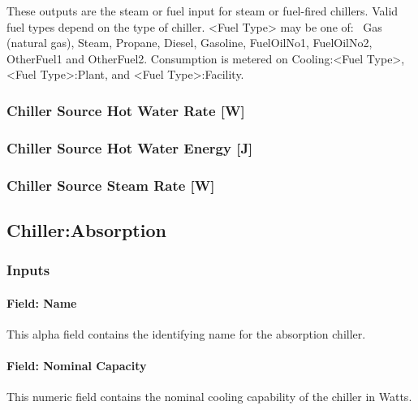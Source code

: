 These outputs are the steam or fuel input for steam or fuel-fired chillers. Valid fuel types depend on the type of chiller. \textless{}Fuel Type\textgreater{} may be one of:~ Gas (natural gas), Steam, Propane, Diesel, Gasoline, FuelOilNo1, FuelOilNo2, OtherFuel1 and OtherFuel2. Consumption is metered on Cooling:\textless{}Fuel Type\textgreater{}, \textless{}Fuel Type\textgreater{}:Plant, and \textless{}Fuel Type\textgreater{}:Facility.

\subsubsection{Chiller Source Hot Water Rate {[}W{]}}\label{chiller-source-hot-water-rate-w}

\subsubsection{Chiller Source Hot Water Energy {[}J{]}}\label{chiller-source-hot-water-energy-j}

\subsubsection{Chiller Source Steam Rate {[}W{]}}\label{chiller-source-steam-rate-w}

\subsection{Chiller:Absorption}\label{chillerabsorption}

\subsubsection{Inputs}\label{inputs-036}

\paragraph{Field: Name}\label{field-name-035}

This alpha field contains the identifying name for the absorption chiller.

\paragraph{Field: Nominal Capacity}\label{field-nominal-capacity-001}

This numeric field contains the nominal cooling capability of the chiller in Watts.

